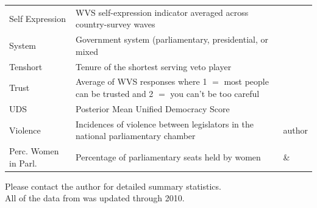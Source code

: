 \documentclass[a4paper]{article}\usepackage[]{graphicx}\usepackage[]{color}
\begin{document}
\begin{table}[!h]
\begin{center}
\begin{tabular}{l m{7cm} m{3.5cm}}
            Self Expression & WVS self-expression indicator averaged across country-survey waves & \cite{WVS2009} \\
            System & Government system (parliamentary, presidential, or mixed & \cite{DPI2001} \\
            Tenshort & Tenure of the shortest serving veto player & \cite{DPI2001} \\
            Trust & Average of WVS responses where 1 $=$ most people can be trusted and 2 $=$ you can't be too careful & \cite{WVS2009} \\
            UDS & Posterior Mean Unified Democracy Score & \cite{Pemstein2010} \\
            Violence & Incidences of violence between legislators in the national parliamentary chamber & author \\
            Perc. Women in Parl. & Percentage of parliamentary seats held by women & \cite{WomParCrossNat} \& \cite{IPU2013} \\
            \hline

    \end{tabular}
    \end{center}
    \begin{singlespace}
        Please contact the author for detailed summary statistics. \\
        All of the data from \cite{DPI2001} was updated through 2010.
    \end{singlespace}
\end{table}
\end{document}
